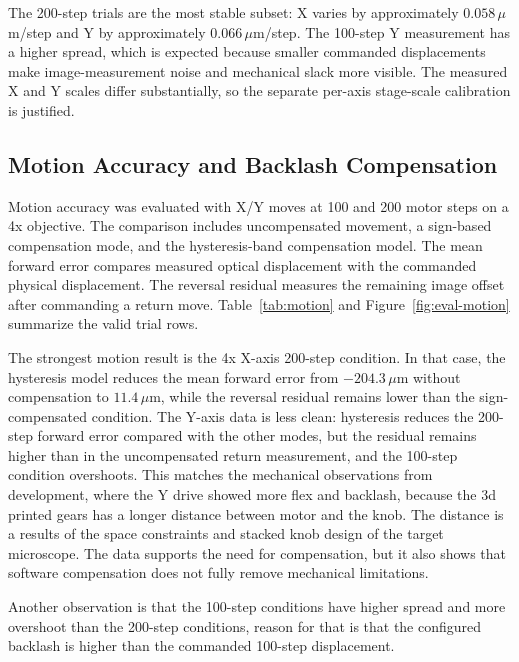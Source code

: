 The 200-step trials are the most stable subset: X varies by approximately
$0.058\,\mu$m/step and Y by approximately $0.066\,\mu$m/step. The 100-step Y measurement has a
higher spread, which is expected because smaller commanded displacements make image-measurement
noise and mechanical slack more visible. The measured X and Y scales differ substantially, so the
separate per-axis stage-scale calibration is justified.

\subsection{Motion Accuracy and Backlash Compensation}

Motion accuracy was evaluated with X/Y moves at 100 and 200 motor steps on a 4x objective. The comparison includes
uncompensated movement, a sign-based compensation mode, and the hysteresis-band
compensation model. The mean forward error compares measured optical displacement with the commanded
physical displacement. The reversal residual measures the remaining image offset after commanding a
return move. Table~\ref{tab:motion} and Figure~\ref{fig:eval-motion} summarize the valid trial
rows.



The strongest motion result is the 4x X-axis 200-step condition. In that case, the hysteresis model reduces the mean forward error from $-204.3\,\mu$m without compensation to
$11.4\,\mu$m, while the reversal residual remains lower than the sign-compensated condition. The Y-axis data is less clean: hysteresis reduces the 200-step forward error compared with the other modes, but the residual remains higher than in the uncompensated return measurement, and the 100-step condition overshoots. This matches the mechanical observations from development, where the Y drive showed more flex and backlash, because the 3d printed gears has a longer distance between motor and the knob. The distance is a results of the space constraints and stacked knob design of the target microscope. The data supports the need for compensation, but it also shows that software compensation does not fully remove mechanical limitations.

Another observation is that the 100-step conditions have higher spread and more overshoot than the 200-step conditions, reason for that is that the configured backlash is higher than the commanded 100-step displacement.

